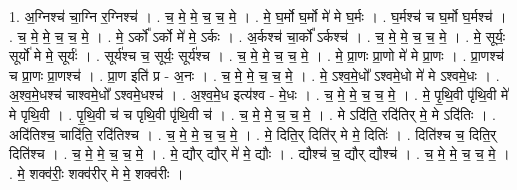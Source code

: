 \documentclass[17pt]{extarticle}
\begin{document}
1. अ॒ग्निश्च॑ चा॒ग्नि र॒ग्निश्च॑ । . च॒ मे॒ मे॒ च॒ च॒ मे॒ । . मे॒ घ॒र्मो घ॒र्मो मे॑ मे घ॒र्मः । . घ॒र्मश्च॑ च घ॒र्मो घ॒र्मश्च॑ । . च॒ मे॒ मे॒ च॒ च॒ मे॒ । . मे॒ ऽर्को᳚ ऽर्को मे॑ मे॒ ऽर्कः । . अ॒र्कश्च॑ चा॒र्को᳚ ऽर्कश्च॑ । . च॒ मे॒ मे॒ च॒ च॒ मे॒ । . मे॒ सूर्यः॒ सूर्यो॑ मे मे॒ सूर्यः॑ । . सूर्य॑श्च च॒ सूर्यः॒ सूर्य॑श्च । . च॒ मे॒ मे॒ च॒ च॒ मे॒ । . मे॒ प्रा॒णः प्रा॒णो मे॑ मे प्रा॒णः । . प्रा॒णश्च॑ च प्रा॒णः प्रा॒णश्च॑ । . प्रा॒ण इति॑ प्र - अ॒नः । . च॒ मे॒ मे॒ च॒ च॒ मे॒ । . मे॒ ऽश्व॒मे॒धो᳚ ऽश्वमे॒धो मे॑ मे ऽश्वमे॒धः । . अ॒श्व॒मे॒धश्च॑ चाश्वमे॒धो᳚ ऽश्वमे॒धश्च॑ । . अ॒श्व॒मे॒ध इत्य॑श्व - मे॒धः । . च॒ मे॒ मे॒ च॒ च॒ मे॒ । . मे॒ पृ॒थि॒वी पृ॑थि॒वी मे॑ मे पृथि॒वी । . पृ॒थि॒वी च॑ च पृथि॒वी पृ॑थि॒वी च॑ । . च॒ मे॒ मे॒ च॒ च॒ मे॒ । . मे ऽदि॑ति॒ रदि॑तिर् मे॒ मे ऽदि॑तिः । . अदि॑तिश्च॒ चादि॑ति॒ रदि॑तिश्च । . च॒ मे॒ मे॒ च॒ च॒ मे॒ । . मे॒ दिति॒र् दिति॑र् मे मे॒ दितिः॑ । . दिति॑श्च च॒ दिति॒र् दिति॑श्च । . च॒ मे॒ मे॒ च॒ च॒ मे॒ । . मे॒ द्यौर् द्यौर् मे॑ मे॒ द्यौः । . द्यौश्च॑ च॒ द्यौर् द्यौश्च॑ । . च॒ मे॒ मे॒ च॒ च॒ मे॒ । . मे॒ शक्व॑रीः॒ शक्व॑रीर् मे मे॒ शक्व॑रीः । \newline
\end{document}
